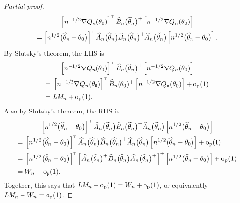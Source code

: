 \documentclass[11pt,letterpaper,reqno,oneside]{article}
\begin{document}
\begin{proof}[Partial proof]
\begin{multline*}
		\left[ n^{-1/2} \nabla Q_n( \theta_0 ) \right]^{\scriptscriptstyle \top}
		\widehat{B}_n\bigl( \widetilde{\theta}_n \bigr)^+
		\left[ n^{-1/2} \nabla Q_n( \theta_0 ) \right]
		\\
		= 
		\left[ n^{1/2} \bigl( \widehat{\theta}_n - \theta_0 \bigr) \right]^{\scriptscriptstyle \top}
		\widehat{A}_n\bigl( \widetilde{\theta}_n \bigr)
		\widehat{B}_n\bigl( \widetilde{\theta}_n \bigr)^+
		\widehat{A}_n\bigl( \widetilde{\theta}_n \bigr)
		\left[ n^{1/2} \bigl( \widehat{\theta}_n - \theta_0 \bigr) \right] .
	\end{multline*}
	By Slutsky's theorem, the LHS is
	\begin{multline*}
		\left[ n^{-1/2} \nabla Q_n( \theta_0 ) \right]^{\scriptscriptstyle \top}
		\widehat{B}_n\bigl( \widetilde{\theta}_n \bigr)^+
		\left[ n^{-1/2} \nabla Q_n( \theta_0 ) \right]
		\\
		\begin{aligned}
			={}& \left[ n^{-1/2} \nabla Q_n( \theta_0 ) \right]^{\scriptscriptstyle \top}
			\widehat{B}_n(\theta_0)^+
			\left[ n^{-1/2} \nabla Q_n( \theta_0 ) \right]
			+ \mathrm{o}_{\mathrm{p}}(1)
			\\
			={}& \textit{LM}_n + \mathrm{o}_{\mathrm{p}}(1) .
		\end{aligned}
	\end{multline*}
	Also by Slutsky's theorem, the RHS is
	\begin{multline*}
		\left[ n^{1/2} \bigl( \widehat{\theta}_n - \theta_0 \bigr) \right]^{\scriptscriptstyle \top}
		\widehat{A}_n\bigl( \widetilde{\theta}_n \bigr)
		\widehat{B}_n\bigl( \widetilde{\theta}_n \bigr)^+
		\widehat{A}_n\bigl( \widetilde{\theta}_n \bigr)
		\left[ n^{1/2} \bigl( \widehat{\theta}_n - \theta_0 \bigr) \right] 
		\\
		\begin{aligned}
			={}& \left[ n^{1/2} \bigl( \widehat{\theta}_n - \theta_0 \bigr) \right]^{\scriptscriptstyle \top}
			\widehat{A}_n\bigl( \widehat{\theta}_n \bigr)
			\widehat{B}_n\bigl( \widehat{\theta}_n \bigr)^+
			\widehat{A}_n\bigl( \widehat{\theta}_n \bigr)
			\left[ n^{1/2} \bigl( \widehat{\theta}_n - \theta_0 \bigr) \right] 
			+ \mathrm{o}_{\mathrm{p}}(1)
			\\
			={}& \left[ n^{1/2} \bigl( \widehat{\theta}_n - \theta_0 \bigr) \right]^{\scriptscriptstyle \top}
			\left[ \widehat{A}_n\bigl( \widehat{\theta}_n \bigr)^+
			\widehat{B}_n\bigl( \widehat{\theta}_n \bigr)
			\widehat{A}_n\bigl( \widehat{\theta}_n \bigr)^+
			\right]^+
			\left[ n^{1/2} \bigl( \widehat{\theta}_n - \theta_0 \bigr) \right] 
			+ \mathrm{o}_{\mathrm{p}}(1)
			\\
			={}& W_n + \mathrm{o}_{\mathrm{p}}(1) . 
		\end{aligned}
	\end{multline*}
	Together, this says that $\textit{LM}_n + \mathrm{o}_{\mathrm{p}}(1) = W_n + \mathrm{o}_{\mathrm{p}}(1)$, or equivalently $\textit{LM}_n - W_n = \mathrm{o}_{\mathrm{p}}(1)$.
\end{proof}
\end{document}
